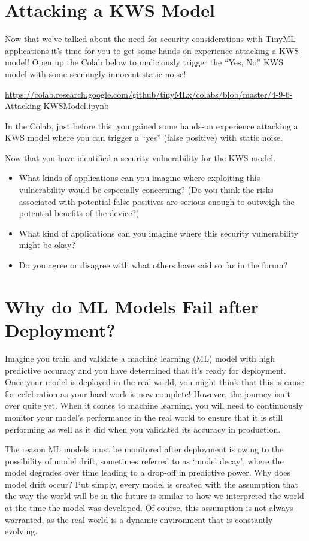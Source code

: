 \section{Attacking a KWS Model}

Now that we’ve talked about the need for security considerations with TinyML applications it's time for you to get some hands-on experience attacking a KWS model! Open up the Colab below to maliciously trigger the “Yes, No” KWS model with some seemingly innocent static noise!

\url{https://colab.research.google.com/github/tinyMLx/colabs/blob/master/4-9-6-Attacking-KWSModel.ipynb}

In the Colab, just before this, you gained some hands-on experience attacking a KWS model where you can trigger a “yes” (false positive) with static noise.

Now that you have identified a security vulnerability for the KWS model.

\begin{itemize}
  \item What kinds of applications can you imagine where exploiting this vulnerability would be especially concerning? (Do you think the risks associated with potential false positives are serious enough to outweigh the potential benefits of the device?)
  \item What kind of applications can you imagine where this security vulnerability might be okay?
  \item Do you agree or disagree with what others have said so far in the forum?
\end{itemize}

\section{Why do ML Models Fail after Deployment?}

  Imagine you train and validate a machine learning (ML) model with high predictive accuracy and you have determined that it’s ready for deployment. Once your model is deployed in the real world, you might think that this is cause for celebration as your hard work is now complete! However, the journey isn’t over quite yet. When it comes to machine learning, you will need to continuously monitor your model’s performance in the real world to ensure that it is still performing as well as it did when you validated its accuracy in production.
    
    The reason ML models must be monitored after deployment is owing to the possibility of model drift, sometimes referred to as ‘model decay’, where the model degrades over time leading to a drop-off in predictive power. Why does model drift occur? Put simply, every model is created with the assumption that the way the world will be in the future is similar to how we interpreted the world at the time the model was developed. Of course, this assumption is not always warranted, as the real world is a dynamic environment that is constantly evolving.
    

